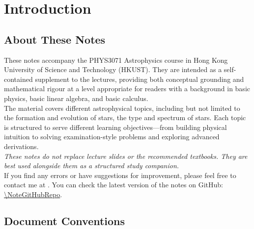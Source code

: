 
\chapter*{Introduction}
{}


\section*{About These Notes}
{}

These notes accompany the PHYS3071 Astrophysics course in Hong Kong University of Science and Technology (HKUST).
They are intended as a self-contained supplement to the lectures,
providing both conceptual grounding and mathematical rigour at a level
appropriate for readers with a background in basic physics, basic linear algebra, and basic calculus. \\

The material covers different astrophysical topics, including but not limited to the formation and evolution of stars, the type and spectrum of stars.
Each topic is structured to serve different learning objectives---from building
physical intuition to solving examination-style problems and exploring
advanced derivations. \\

\textit{These notes do not replace lecture slides or the recommended textbooks.
They are best used alongside them as a structured study companion.} \\

If you find any errors or have suggestions for improvement, please feel free to contact me at \texttt{\NoteAuthorEmail}. You can check the latest version of the notes on GitHub: \url{\NoteGitHubRepo}.

\section*{Document Conventions}
{}

